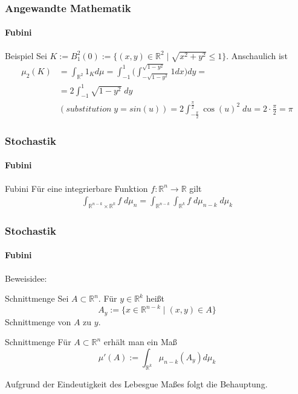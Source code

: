 \documentclass{beamer}
\begin{document}
 \begin{frame}
    \frametitle{Angewandte Mathematik}
    \framesubtitle{Fubini}
    \begin{block}{Beispiel}
Sei $K := B^2_1(0) := \{   (x,y) \in \mathbb{R}^2 \; | \; \sqrt{x^2 + y^2 } \leq 1\}$. Anschaulich ist
\begin{align*}
\mu_2(K) &  = \int_{\mathbb{R}^2} 1_K  d \mu =  \int_{-1}^{1} \biggl ( \int_{-\sqrt{1- y^2}}^{\sqrt{1- y^2}} 1 dx \biggr ) dy = \\ 
& =  2 \int_{-1}^{1}  \sqrt{1 - y^2}   \; dy  \\ 
 & (substitution \;   y = sin(u)) =   2 \int_{-\frac{\pi}{2}}^{\frac{\pi}{2}}   \cos(u)^2   \; du = 2 \cdot \frac{\pi}{2} = \pi
\end{align*}
\end{block}
 \end{frame}
 
 \begin{frame}
    \frametitle{Stochastik}
\framesubtitle{Fubini}
    \begin{block}{Fubini}
        Für eine integrierbare Funktion $f: \mathbb{R}^n \to \mathbb{R}$ gilt
        \begin{align*}
        \int_{\mathbb{R}^{n-k} \times \mathbb{R}^{k}} f \; d\mu_n  =  \int_{\mathbb{R}^{n-k}}  \int_{\mathbb{R}^k}  f \; d\mu_{n-k} \;  d\mu_k  
        \end{align*}
    \end{block}

\end{frame}

\begin{frame}
    \frametitle{Stochastik}
\framesubtitle{Fubini}
Beweisidee:

\begin{block}{Schnittmenge}
Sei $ A \subset \mathbb{R}^n$. Für $ y \in \mathbb{R}^k$ heißt
$$ A_y :=  \biggl \{    x \in \mathbb{R}^{n-k}  \; | \;  (x,y) \in A \biggr \}$$  
Schnittmenge von $A$ zu $y$.
\end{block}

\begin{block}{Schnittmenge}
    Für $A \subset \mathbb{R}^n $ erhält man ein Maß
    $$ \mu'(A) := \int_{\mathbb{R}^k} \mu_{n-k}(A_y) d \mu_k$$ 
\end{block}
Aufgrund der Eindeutigkeit des Lebesgue Maßes folgt die Behauptung.
\end{frame}
\end{document}
